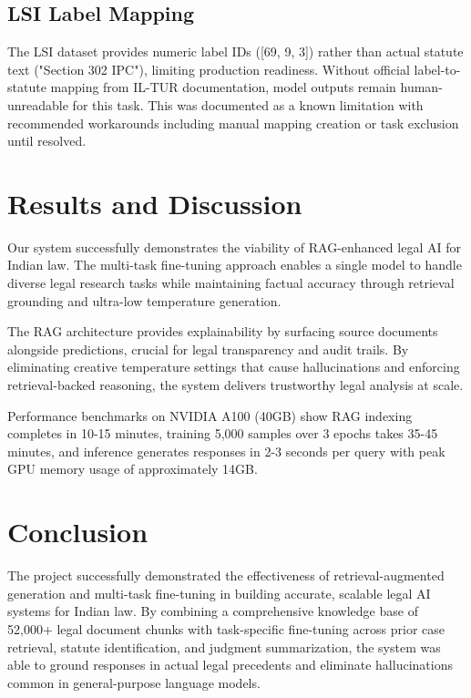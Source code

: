 \documentclass[11pt]{article}
\begin{document}
\subsection{LSI Label Mapping}

The LSI dataset provides numeric label IDs ([69, 9, 3]) rather than actual statute text ("Section 302 IPC"), limiting production readiness. Without official label-to-statute mapping from IL-TUR documentation, model outputs remain human-unreadable for this task. This was documented as a known limitation with recommended workarounds including manual mapping creation or task exclusion until resolved.

\section{Results and Discussion}

Our system successfully demonstrates the viability of RAG-enhanced legal AI for Indian law. The multi-task fine-tuning approach enables a single model to handle diverse legal research tasks while maintaining factual accuracy through retrieval grounding and ultra-low temperature generation.

The RAG architecture provides explainability by surfacing source documents alongside predictions, crucial for legal transparency and audit trails. By eliminating creative temperature settings that cause hallucinations and enforcing retrieval-backed reasoning, the system delivers trustworthy legal analysis at scale.

Performance benchmarks on NVIDIA A100 (40GB) show RAG indexing completes in 10-15 minutes, training 5,000 samples over 3 epochs takes 35-45 minutes, and inference generates responses in 2-3 seconds per query with peak GPU memory usage of approximately 14GB.

\section{Conclusion}

The project successfully demonstrated the effectiveness of retrieval-augmented generation and multi-task fine-tuning in building accurate, scalable legal AI systems for Indian law. By combining a comprehensive knowledge base of 52,000+ legal document chunks with task-specific fine-tuning across prior case retrieval, statute identification, and judgment summarization, the system was able to ground responses in actual legal precedents and eliminate hallucinations common in general-purpose language models.
\end{document}

